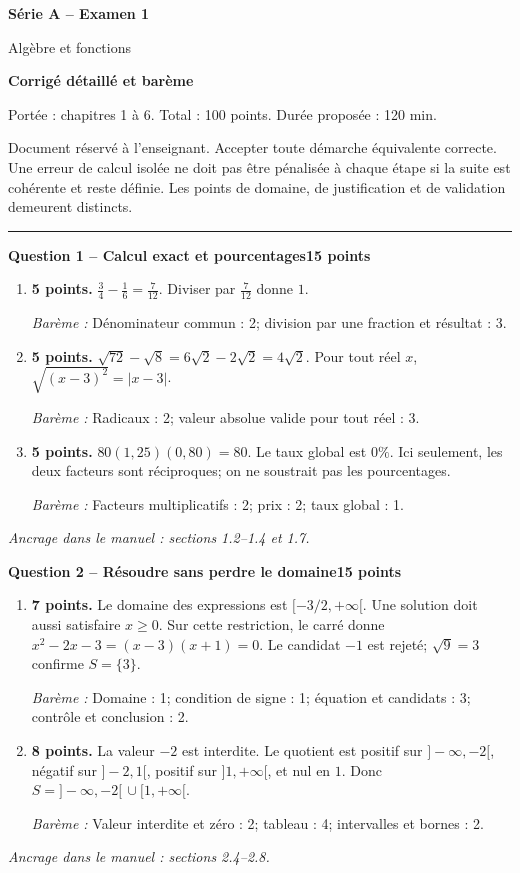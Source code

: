 \documentclass[11pt,a4paper]{article}
\begin{document}
{\LARGE\bfseries Série A -- Examen 1}\par
{\large Algèbre et fonctions}\par
\textbf{Corrigé détaillé et barème}\par
Portée : chapitres 1 à 6. Total : 100 points. Durée proposée : 120 min.\par
\small Document réservé à l’enseignant. Accepter toute démarche équivalente correcte. Une erreur de calcul isolée ne doit pas être pénalisée à chaque étape si la suite est cohérente et reste définie. Les points de domaine, de justification et de validation demeurent distincts.\normalsize\par
\vspace{3mm}\hrule\vspace{4mm}
{\large\bfseries Question 1 -- Calcul exact et pourcentages}\hfill\textbf{15 points}\par
\begin{enumerate}
\item \textbf{5 points.} \(\frac34-\frac16=\frac7{12}\). Diviser par \(\frac7{12}\) donne \(1\).
\par{\small\textit{Barème : }Dénominateur commun : 2; division par une fraction et résultat : 3.}
\item \textbf{5 points.} \(\sqrt{72}-\sqrt8=6\sqrt2-2\sqrt2=4\sqrt2\). Pour tout réel \(x\), \(\sqrt{(x-3)^2}=|x-3|\).
\par{\small\textit{Barème : }Radicaux : 2; valeur absolue valide pour tout réel : 3.}
\item \textbf{5 points.} \(80(1{,}25)(0{,}80)=80\). Le taux global est \(0\%\). Ici seulement, les deux facteurs sont réciproques; on ne soustrait pas les pourcentages.
\par{\small\textit{Barème : }Facteurs multiplicatifs : 2; prix : 2; taux global : 1.}
\end{enumerate}
\vfill {\small\textit{Ancrage dans le manuel : sections 1.2--1.4 et 1.7.}}

\newpage
{\large\bfseries Question 2 -- Résoudre sans perdre le domaine}\hfill\textbf{15 points}\par
\begin{enumerate}
\item \textbf{7 points.} Le domaine des expressions est \([ -3/2,+\infty[\). Une solution doit aussi satisfaire \(x\ge0\). Sur cette restriction, le carré donne \(x^2-2x-3=(x-3)(x+1)=0\). Le candidat \(-1\) est rejeté; \(\sqrt9=3\) confirme \(S=\{3\}\).
\par{\small\textit{Barème : }Domaine : 1; condition de signe : 1; équation et candidats : 3; contrôle et conclusion : 2.}
\item \textbf{8 points.} La valeur \(-2\) est interdite. Le quotient est positif sur \(]-\infty,-2[\), négatif sur \(]-2,1[\), positif sur \(]1,+\infty[\), et nul en \(1\). Donc \(S=]-\infty,-2[\,\cup[1,+\infty[\).
\par{\small\textit{Barème : }Valeur interdite et zéro : 2; tableau : 4; intervalles et bornes : 2.}
\end{enumerate}
\vfill {\small\textit{Ancrage dans le manuel : sections 2.4--2.8.}}
\end{document}
